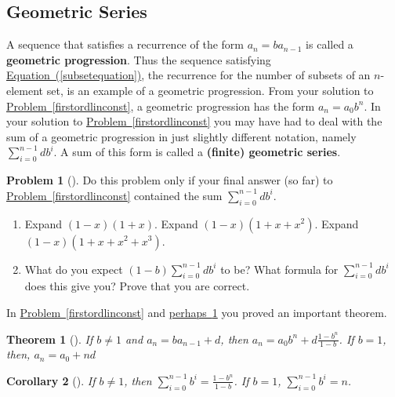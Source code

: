 \documentclass[10pt,]{book}
\newcommand{\terminology}[1]{\textbf{#1}}
\theoremstyle{plain}
\newtheorem{theorem}{Theorem}[section]
\newtheorem{corollary}[theorem]{Corollary}
\theoremstyle{definition}
\newtheorem{activity}[project]{Problem}
\theoremstyle{definition}
\numberwithin{equation}{chapter}
\begin{document}
\subsection[{Geometric Series}]{Geometric Series}\label{subsection-20}
A sequence that satisfies a recurrence of the form \(a_n=ba_{n-1}\) is called a \terminology{geometric progression}. Thus the sequence satisfying \hyperref[subsetequation]{Equation~(\ref{subsetequation})}, the recurrence for the number of subsets of an \(n\)-element set, is an example of a geometric progression. From your solution to \hyperref[firstordlinconst]{Problem~\ref{firstordlinconst}}, a geometric progression has the form \(a_n=a_0b^n\). In your solution to \hyperref[firstordlinconst]{Problem~\ref{firstordlinconst}} you may have had to deal with the sum of a geometric progression in just slightly different notation, namely \(\sum_{i=0}^{n-1}db^i\). A sum of this form is called a \terminology{(finite) geometric series}.%
\begin{activity}[]\marginsymbol[-1em]{} \label{sumgeometricseries}
Do this problem only if your final answer (so far) to \hyperref[firstordlinconst]{Problem~\ref{firstordlinconst}} contained the sum \(\sum_{i=0}^{n-1}db^i\).%
\begin{enumerate}[font=\bfseries,label=(\alph*),ref=\alph*]
\item\label{task-89} \marginsymbol[-2.5em]{} Expand \((1-x)(1+x)\).  Expand \((1-x)(1+x+x^2)\). Expand \((1-x)(1+x+x^2+x^3)\).%
\item\label{task-90} \marginsymbol[-2.5em]{} What do you expect \((1-b)\sum_{i=0}^{n-1} db^i\) to be?  What formula for \(\sum_{i=0}^{n-1}db^i\) does this give you?  Prove that you are correct.%
\end{enumerate}
\end{activity}
In \hyperref[firstordlinconst]{Problem~\ref{firstordlinconst}} and \hyperref[sumgeometricseries]{perhaps~\ref{sumgeometricseries}} you proved an important theorem.%
\begin{theorem}[{}]\label{theorem-2}
If \(b\not=1\) and \(a_n=ba_{n-1} +d\), then \(\displaystyle a_n =
a_0b^n + d\frac{1-b^n}{1-b}\). If \(b=1\), then, \(\displaystyle a_n =
a_0 +nd\)%
\end{theorem}
\begin{corollary}[{}]\label{corollary-1}
If \(b\not=1\), then \(\displaystyle \sum_{i=0}^{n-1}b^i =
\frac{1-b^n}{1-b}\). If \(b=1\), \(\displaystyle \sum_{i=0}^{n-1}b^i =n\).%
\end{corollary}
\typeout{************************************************}
\typeout{************************************************}
\end{document}
